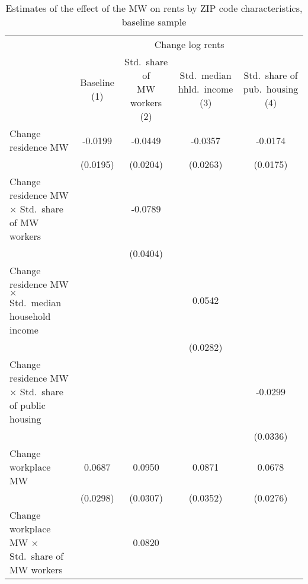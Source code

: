 \begin{landscape}
\begin{table}[hbt!] \centering
    \caption{Estimates of the effect of the MW on rents by ZIP code characteristics, baseline sample}
    \label{tab:heterogeneity}
    \begin{tabular}{@{}lcccc@{}}
        \toprule
            & \multicolumn{4}{c}{Change log rents}                                                  \\ \cmidrule(l){2-5} 
            & \shortstack{Baseline\\(1)} 
            & \shortstack{Std.\ share of\\MW workers (2)}                                             
            & \shortstack{Std.\ median\\hhld.\ income (3)}
            & \shortstack{Std.\ share of\\pub.\ housing (4)}                             \\ \midrule
        Change residence MW                                       &  -0.0199   &  -0.0449  &  -0.0357   &  -0.0174   \\
                                                                  & (0.0195)  & (0.0204) & (0.0263)  & (0.0175)  \\
        Change residence MW $\times$ Std.\ share of MW workers    &        &  -0.0789  &        &        \\
                                                                  &        & (0.0404) &        &        \\
        Change residence MW $\times$ Std.\ median household income&        &       &  0.0542   &        \\
                                                                  &        &       & (0.0282)  &        \\
        Change residence MW $\times$ Std.\ share of public housing&        &       &        &  -0.0299   \\
                                                                  &        &       &        & (0.0336)  \\
        Change workplace MW                                       &  0.0687   &  0.0950  &  0.0871   &  0.0678   \\
                                                                  & (0.0298)  & (0.0307) & (0.0352)  & (0.0276)  \\
        Change workplace MW $\times$ Std.\ share of MW workers    &        &  0.0820  &        &        \\

\end{tabular}
\end{table}
\end{landscape}
